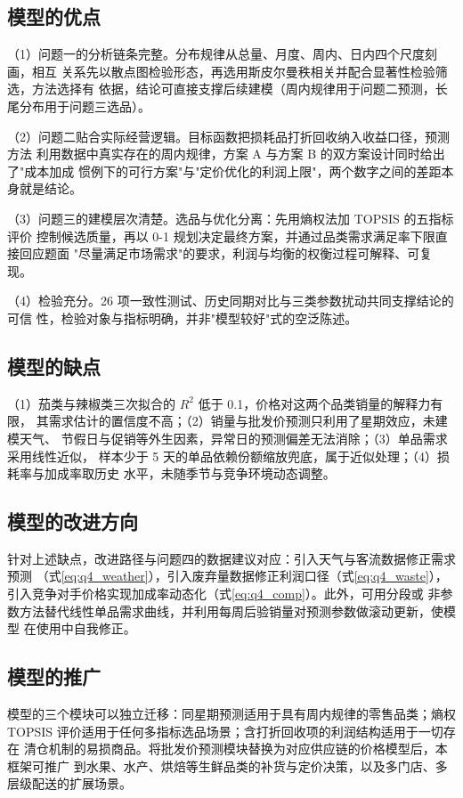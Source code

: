 
\subsection{模型的优点}

（1）问题一的分析链条完整。分布规律从总量、月度、周内、日内四个尺度刻画，相互
关系先以散点图检验形态，再选用斯皮尔曼秩相关并配合显著性检验筛选，方法选择有
依据，结论可直接支撑后续建模（周内规律用于问题二预测，长尾分布用于问题三选品）。

（2）问题二贴合实际经营逻辑。目标函数把损耗品打折回收纳入收益口径，预测方法
利用数据中真实存在的周内规律，方案 A 与方案 B 的双方案设计同时给出了"成本加成
惯例下的可行方案"与"定价优化的利润上限"，两个数字之间的差距本身就是结论。

（3）问题三的建模层次清楚。选品与优化分离：先用熵权法加 TOPSIS 的五指标评价
控制候选质量，再以 0-1 规划决定最终方案，并通过品类需求满足率下限直接回应题面
"尽量满足市场需求"的要求，利润与均衡的权衡过程可解释、可复现。

（4）检验充分。26 项一致性测试、历史同期对比与三类参数扰动共同支撑结论的可信
性，检验对象与指标明确，并非"模型较好"式的空泛陈述。

\subsection{模型的缺点}

（1）茄类与辣椒类三次拟合的 $R^2$ 低于 0.1，价格对这两个品类销量的解释力有限，
其需求估计的置信度不高；（2）销量与批发价预测只利用了星期效应，未建模天气、
节假日与促销等外生因素，异常日的预测偏差无法消除；（3）单品需求采用线性近似，
样本少于 5 天的单品依赖份额缩放兜底，属于近似处理；（4）损耗率与加成率取历史
水平，未随季节与竞争环境动态调整。

\subsection{模型的改进方向}

针对上述缺点，改进路径与问题四的数据建议对应：引入天气与客流数据修正需求预测
（式\eqref{eq:q4_weather}），引入废弃量数据修正利润口径（式\eqref{eq:q4_waste}），
引入竞争对手价格实现加成率动态化（式\eqref{eq:q4_comp}）。此外，可用分段或
非参数方法替代线性单品需求曲线，并利用每周后验销量对预测参数做滚动更新，使模型
在使用中自我修正。

\subsection{模型的推广}

模型的三个模块可以独立迁移：同星期预测适用于具有周内规律的零售品类；熵权
TOPSIS 评价适用于任何多指标选品场景；含打折回收项的利润结构适用于一切存在
清仓机制的易损商品。将批发价预测模块替换为对应供应链的价格模型后，本框架可推广
到水果、水产、烘焙等生鲜品类的补货与定价决策，以及多门店、多层级配送的扩展场景。
